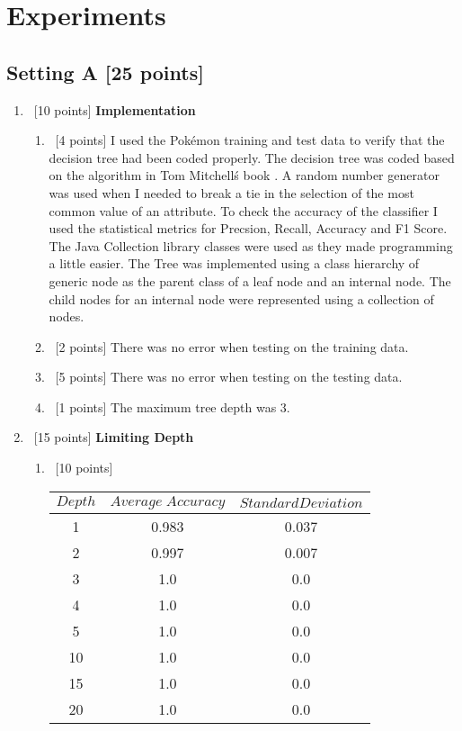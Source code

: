 \section{Experiments}
\label{sec:q1}

\subsection*{Setting A [25 points]}

\begin{enumerate}
\item ~[10 points] \textbf{Implementation}

  \begin{enumerate}
  \item ~[4 points] I used the Pok\'emon training and test data to verify that the decision tree had been coded properly. The decision tree was coded based on the algorithm in Tom Mitchell\'s book \cite{Mitchell}. A random number generator was used when I needed to break a tie in the selection of the most common value of an attribute. To check the accuracy of the classifier I used the statistical metrics for Precsion, Recall, Accuracy and F1 Score. The Java Collection library classes were used as they made programming a little easier. The Tree was implemented using a class hierarchy of generic node as the parent class of a leaf node and an internal node. The child nodes for an internal node were represented using a collection of nodes.
    
  \item ~[2 points]  There was no error when testing on the training data.
    
  \item ~[5 points] There was no error when testing on the testing data.
    
  \item ~[1 points] The maximum tree depth was 3.
  \end{enumerate}

\item ~[15 points] \textbf{Limiting Depth}

  \begin{enumerate}
  \item ~[10 points] 
    \begin{center}
    \begin{tabular}{c|c|c}
      $Depth$ & $Average \; Accuracy$ & $Standard Deviation$\\ \hline
      1 & 0.983 & 0.037\\
      2 &  0.997 & 0.007\\
       3 & 1.0 & 0.0\\
       4 & 1.0 & 0.0\\
       5 & 1.0 & 0.0\\
       10 &1.0 & 0.0\\
      15 & 1.0 & 0.0\\
      20 & 1.0 & 0.0
    \end{tabular}
  \end{center}
    

\end{enumerate}
\end{enumerate}
